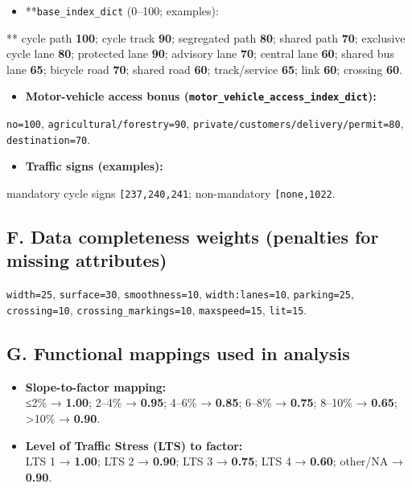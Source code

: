 \documentclass[
  12pt,
  oneside]{book}
\providecommand{\tightlist}{%
  \setlength{\itemsep}{0pt}\setlength{\parskip}{0pt}}
\begin{document}
\begin{itemize}
\tightlist
\item
  **\texttt{base\_index\_dict} (0--100; examples):
\end{itemize}

** cycle path \textbf{100}; cycle track \textbf{90}; segregated path \textbf{80}; shared path \textbf{70}; exclusive cycle lane \textbf{80}; protected lane \textbf{90}; advisory lane \textbf{70}; central lane \textbf{60}; shared bus lane \textbf{65}; bicycle road \textbf{70}; shared road \textbf{60}; track/service \textbf{65}; link \textbf{60}; crossing \textbf{60}.

\begin{itemize}
\tightlist
\item
  \textbf{Motor-vehicle access bonus (\texttt{motor\_vehicle\_access\_index\_dict}):}
\end{itemize}

\texttt{no=100}, \texttt{agricultural/forestry=90}, \texttt{private/customers/delivery/permit=80}, \texttt{destination=70}.

\begin{itemize}
\tightlist
\item
  \textbf{Traffic signs (examples):}
\end{itemize}

mandatory cycle signs \texttt{{[}\textquotesingle{}237\textquotesingle{},\textquotesingle{}240\textquotesingle{},\textquotesingle{}241\textquotesingle{}{]}}; non-mandatory \texttt{{[}\textquotesingle{}none\textquotesingle{},\textquotesingle{}1022\textquotesingle{}{]}}.

\subsection*{F. Data completeness weights (penalties for missing attributes)}\label{f.-data-completeness-weights-penalties-for-missing-attributes}

\texttt{width=25}, \texttt{surface=30}, \texttt{smoothness=10}, \texttt{width:lanes=10}, \texttt{parking=25}, \texttt{crossing=10}, \texttt{crossing\_markings=10}, \texttt{maxspeed=15}, \texttt{lit=15}.

\subsection*{G. Functional mappings used in analysis}\label{g.-functional-mappings-used-in-analysis}

\begin{itemize}
\tightlist
\item
  \textbf{Slope-to-factor mapping:}\\
  ≤2\% → \textbf{1.00}; 2--4\% → \textbf{0.95}; 4--6\% → \textbf{0.85}; 6--8\% → \textbf{0.75}; 8--10\% → \textbf{0.65}; \textgreater10\% → \textbf{0.90}.
\item
  \textbf{Level of Traffic Stress (LTS) to factor:}\\
  LTS 1 → \textbf{1.00}; LTS 2 → \textbf{0.90}; LTS 3 → \textbf{0.75}; LTS 4 → \textbf{0.60}; other/NA → \textbf{0.90}.
\end{itemize}
\end{document}
